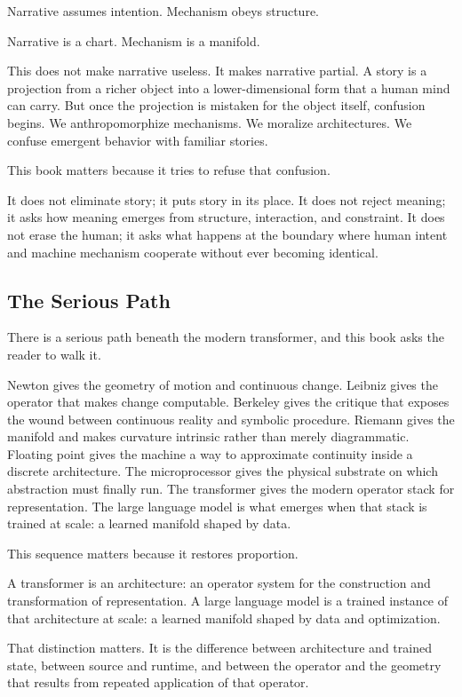 Narrative assumes intention. Mechanism obeys structure.

Narrative is a chart. Mechanism is a manifold.

This does not make narrative useless. It makes narrative partial. A
story is a projection from a richer object into a lower-dimensional form
that a human mind can carry. But once the projection is mistaken for the
object itself, confusion begins. We anthropomorphize mechanisms. We
moralize architectures. We confuse emergent behavior with familiar
stories.

This book matters because it tries to refuse that confusion.

It does not eliminate story; it puts story in its place. It does not
reject meaning; it asks how meaning emerges from structure, interaction,
and constraint. It does not erase the human; it asks what happens at the
boundary where human intent and machine mechanism cooperate without ever
becoming identical.

\hypertarget{the-serious-path}{%
\subsection{The Serious Path}\label{the-serious-path}}

There is a serious path beneath the modern transformer, and this book
asks the reader to walk it.

Newton gives the geometry of motion and continuous change. Leibniz gives
the operator that makes change computable. Berkeley gives the critique
that exposes the wound between continuous reality and symbolic
procedure. Riemann gives the manifold and makes curvature intrinsic
rather than merely diagrammatic. Floating point gives the machine a way
to approximate continuity inside a discrete architecture. The
microprocessor gives the physical substrate on which abstraction must
finally run. The transformer gives the modern operator stack for
representation. The large language model is what emerges when that stack
is trained at scale: a learned manifold shaped by data.

This sequence matters because it restores proportion.

A transformer is an architecture: an operator system for the
construction and transformation of representation. A large language
model is a trained instance of that architecture at scale: a learned
manifold shaped by data and optimization.

That distinction matters. It is the difference between architecture and
trained state, between source and runtime, and between the operator and
the geometry that results from repeated application of that operator.

